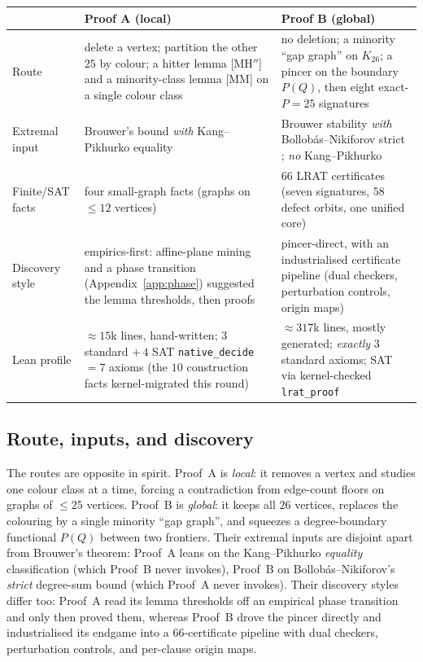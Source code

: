 \documentclass[11pt,reqno]{amsart}
\theoremstyle{definition}
\theoremstyle{remark}
\begin{document}
\begin{center}\small
\renewcommand{\arraystretch}{1.35}
\begin{tabular}{@{}p{}p{}p{}@{}}
\toprule
 & \textbf{Proof A} (local) & \textbf{Proof B} (global)\\
\midrule
Route & delete a vertex; partition the other $25$ by colour; a hitter lemma
\textsf{[MH$''$]} and a minority-class lemma \textsf{[MM]} on a single colour class &
no deletion; a minority ``gap graph'' on $K_{26}$; a pincer on the boundary $P(Q)$, then
eight exact-$P=25$ signatures\\
Extremal input & Brouwer's bound \cite{Brouwer81} \emph{with} Kang--Pikhurko equality
\cite{KP05} & Brouwer stability \cite{Brouwer81} \emph{with} Bollob\'as--Nikiforov strict
\cite{BN05}; \emph{no} Kang--Pikhurko\\
Finite/SAT facts & four small-graph facts (graphs on $\le 12$ vertices) & $66$ LRAT
certificates (seven signatures, $58$ defect orbits, one unified core)\\
Discovery style & empirics-first: affine-plane mining and a phase transition
(Appendix~\ref{app:phase}) suggested the lemma thresholds, then proofs & pincer-direct,
with an industrialised certificate pipeline (dual checkers, perturbation controls, origin
maps)\\
Lean profile & $\approx\!15$k lines, hand-written; $3$ standard $+\,4$ SAT
\texttt{native\_decide} $=7$ axioms (the $10$ construction facts kernel-migrated this
round) & $\approx\!317$k lines, mostly generated; \emph{exactly} $3$ standard axioms; SAT
via kernel-checked \texttt{lrat\_proof}\\
\bottomrule
\end{tabular}
\end{center}

\subsection{Route, inputs, and discovery}
The routes are opposite in spirit. Proof~A is \emph{local}: it removes a vertex and studies
one colour class at a time, forcing a contradiction from edge-count floors on graphs of
$\le 25$ vertices. Proof~B is \emph{global}: it keeps all $26$ vertices, replaces the
colouring by a single minority ``gap graph'', and squeezes a degree-boundary functional
$P(Q)$ between two frontiers. Their extremal inputs are disjoint apart from Brouwer's
theorem: Proof~A leans on the Kang--Pikhurko \emph{equality} classification (which Proof~B
never invokes), Proof~B on Bollob\'as--Nikiforov's \emph{strict} degree-sum bound (which
Proof~A never invokes). Their discovery styles differ too: Proof~A read its lemma
thresholds off an empirical phase transition and only then proved them, whereas Proof~B
drove the pincer directly and industrialised its endgame into a $66$-certificate pipeline
with dual checkers, perturbation controls, and per-clause origin maps.
\end{document}
